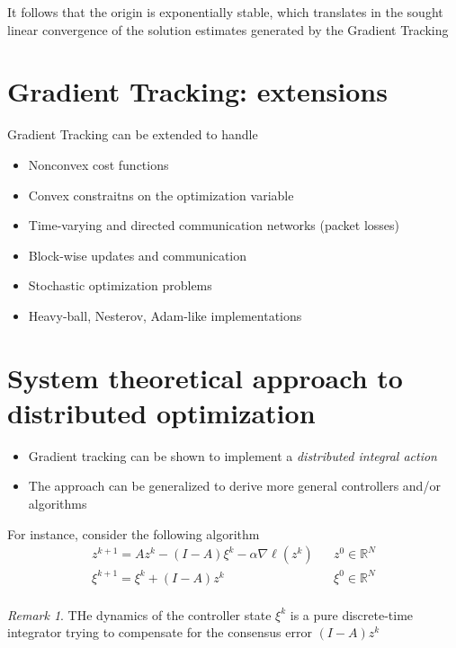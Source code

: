 \documentclass{book}
\newcommand{\R}{\mathbb{R}}
\newcommand{\fatl}{\boldsymbol{\ell}}
\theoremstyle{theoremv2}
\theoremstyle{defv2}
\theoremstyle{remark}
\newtheorem*{remark}{Remark}
\theoremstyle{remark}
\theoremstyle{definition}
\theoremstyle{definition}
\begin{document}
It follows that the origin is exponentially stable, which translates in the sought linear convergence of the solution estimates generated by the Gradient Tracking

\section{Gradient Tracking: extensions}
Gradient Tracking can be extended to handle 
\begin{itemize}
    \item Nonconvex cost functions
    \item Convex constraitns on the optimization variable
    \item Time-varying and directed communication networks (packet losses)
    \item Block-wise updates and communication
    \item Stochastic optimization problems
    \item Heavy-ball, Nesterov, Adam-like implementations
\end{itemize}

\section{System theoretical approach to distributed optimization}
\begin{itemize}
    \item Gradient tracking can be shown to implement a \emph{distributed integral action}
        \item The approach can be generalized to derive more general controllers and/or algorithms
\end{itemize}
For instance, consider the following algorithm
\begin{align*}
    z^{k+1} = Az^k - (I-A)\xi^k - \alpha\nabla\fatl(z^k) && z^0 \in\R^N\\
    \xi^{k+1} = \xi^k + (I-A)z^k && \xi^0 \in\R^N\\
\end{align*}
\begin{remark}
    THe dynamics of the controller state $\xi^k$ is a pure discrete-time integrator trying to compensate for the consensus error $(I-A)z^k$
\end{remark}
\end{document}
